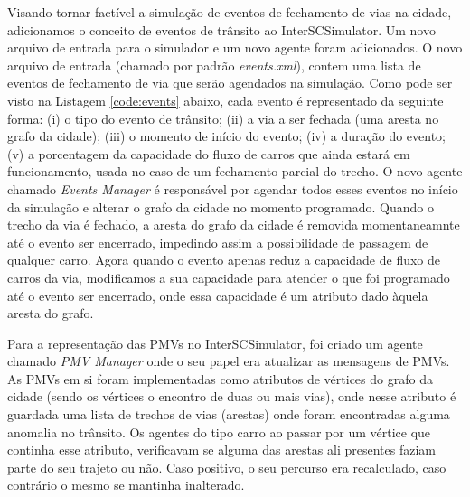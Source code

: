 Visando tornar factível a simulação de eventos de fechamento de vias na cidade, adicionamos o conceito de eventos de trânsito ao InterSCSimulator.
Um novo arquivo de entrada para o simulador e um novo agente foram adicionados.
O novo arquivo de entrada (chamado por padrão \textit{events.xml}), contem uma lista de eventos de fechamento de via que serão agendados na simulação.
Como pode ser visto na Listagem \ref{code:events} abaixo, cada evento é representado da seguinte forma:
(i) o tipo do evento de trânsito;
(ii) a via a ser fechada (uma aresta no grafo da cidade);
(iii) o momento de início do evento;
(iv) a duração do evento;
(v) a porcentagem da capacidade do fluxo de carros que ainda estará em funcionamento, usada no caso de um fechamento parcial do trecho.
O novo agente chamado \textit{Events Manager} é responsável por agendar todos esses eventos no início da simulação e alterar o grafo da cidade no momento programado.
Quando o trecho da via é fechado, a aresta do grafo da cidade é removida momentaneamnte até o evento ser encerrado, impedindo assim a possibilidade de passagem de qualquer
carro.
Agora quando o evento apenas reduz a capacidade de fluxo de carros da via, modificamos a sua capacidade para atender o que foi programado até o evento ser encerrado,
onde essa capacidade é um atributo dado àquela aresta do grafo.

    

Para a representação das PMVs no InterSCSimulator, foi criado um agente chamado \textit{PMV Manager} onde o seu papel era atualizar as mensagens de PMVs.
As PMVs em si foram implementadas como atributos de vértices do grafo da cidade (sendo os vértices o encontro de duas ou mais vias), onde nesse atributo é guardada uma lista
de trechos de vias (arestas) onde foram encontradas alguma anomalia no trânsito.
Os agentes do tipo carro ao passar por um vértice que continha esse atributo, verificavam se alguma das arestas ali presentes faziam parte do seu trajeto ou não.
Caso positivo, o seu percurso era recalculado, caso contrário o mesmo se mantinha inalterado.

